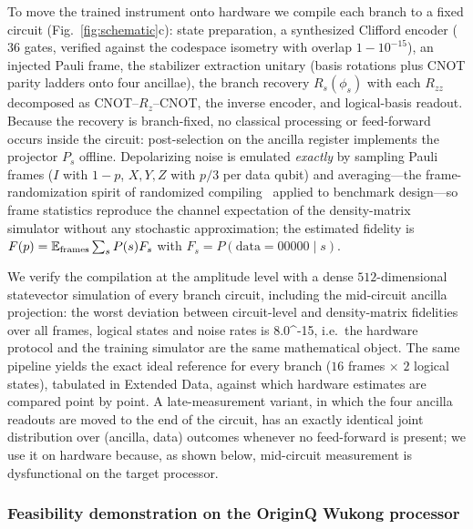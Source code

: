 \documentclass[aps,prxquantum,reprint,superscriptaddress]{revtex4-2}
\begin{document}
To move the trained instrument onto hardware we compile each branch to a
fixed circuit (Fig.~\ref{fig:schematic}c): state preparation, a synthesized
Clifford encoder ($36$ gates, verified against the codespace isometry with
overlap $1-10^{-15}$), an injected Pauli frame, the stabilizer extraction
unitary (basis rotations plus CNOT parity ladders onto four ancillae), the
branch recovery $R_s(\phi_s)$ with each $R_{zz}$ decomposed as
CNOT--$R_z$--CNOT, the inverse encoder, and logical-basis readout. Because
the recovery is branch-fixed, no classical processing or feed-forward occurs
inside the circuit: post-selection on the ancilla register implements the
projector $P_s$ offline. Depolarizing noise is emulated \emph{exactly} by
sampling Pauli frames ($I$ with $1-p$, $X,Y,Z$ with $p/3$ per data qubit) and
averaging---the frame-randomization spirit of randomized
compiling~\cite{wallman_rc} applied to benchmark design---so frame statistics
reproduce the channel expectation of the density-matrix simulator without any
stochastic approximation; the estimated fidelity is
$F(p)=\mathbb{E}_{\rm frames}\sum_s P(s)F_s$ with
$F_s=P(\text{data}=00000\mid s)$.

We verify the compilation at the amplitude level with a dense $512$-dimensional
statevector simulation of every branch circuit, including the mid-circuit
ancilla projection: the worst deviation between circuit-level and
density-matrix fidelities over all frames, logical states and noise rates is
8.0^{-15}, i.e.\ the hardware protocol and the training simulator are the
same mathematical object. The same pipeline yields the exact ideal reference
for every branch ($16$ frames $\times$ $2$ logical states), tabulated in
Extended Data, against which hardware estimates are compared point by point.
A late-measurement variant, in which the four ancilla readouts are moved to
the end of the circuit, has an exactly identical joint distribution over
(ancilla, data) outcomes whenever no feed-forward is present; we use it on
hardware because, as shown below, mid-circuit measurement is dysfunctional on
the target processor.
\subsubsection*{Feasibility demonstration on the OriginQ Wukong processor}
\end{document}
